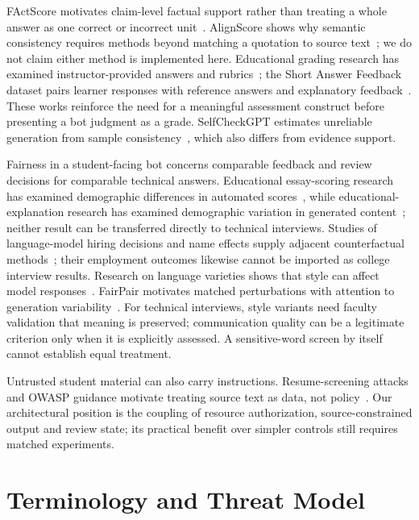 \documentclass[conference]{IEEEtran}
\begin{document}
FActScore motivates claim-level factual support rather than treating a whole answer as one correct or incorrect unit~\cite{min2023factscore}. AlignScore shows why semantic consistency requires methods beyond matching a quotation to source text~\cite{zha2023alignscore}; we do not claim either method is implemented here. Educational grading research has examined instructor-provided answers and rubrics~\cite{golchin2025grading}; the Short Answer Feedback dataset pairs learner responses with reference answers and explanatory feedback~\cite{filighera2022feedback}. These works reinforce the need for a meaningful assessment construct before presenting a bot judgment as a grade. SelfCheckGPT estimates unreliable generation from sample consistency~\cite{manakul2023selfcheck}, which also differs from evidence support.

Fairness in a student-facing bot concerns comparable feedback and review decisions for comparable technical answers. Educational essay-scoring research has examined demographic differences in automated scores~\cite{kwako2024identity}, while educational-explanation research has examined demographic variation in generated content~\cite{weissburg2025teachers}; neither result can be transferred directly to technical interviews. Studies of language-model hiring decisions and name effects supply adjacent counterfactual methods~\cite{an2024discriminate,nghiem2024name}; their employment outcomes likewise cannot be imported as college interview results. Research on language varieties shows that style can affect model responses~\cite{fleisig2024linguistic}. FairPair motivates matched perturbations with attention to generation variability~\cite{dwivediyu2024fairpair}. For technical interviews, style variants need faculty validation that meaning is preserved; communication quality can be a legitimate criterion only when it is explicitly assessed. A sensitive-word screen by itself cannot establish equal treatment.

Untrusted student material can also carry instructions. Resume-screening attacks and OWASP guidance motivate treating source text as data, not policy~\cite{baxi2026prompt,owasp2025llm}. Our architectural position is the coupling of resource authorization, source-constrained output and review state; its practical benefit over simpler controls still requires matched experiments.

\section{Terminology and Threat Model}
\end{document}
